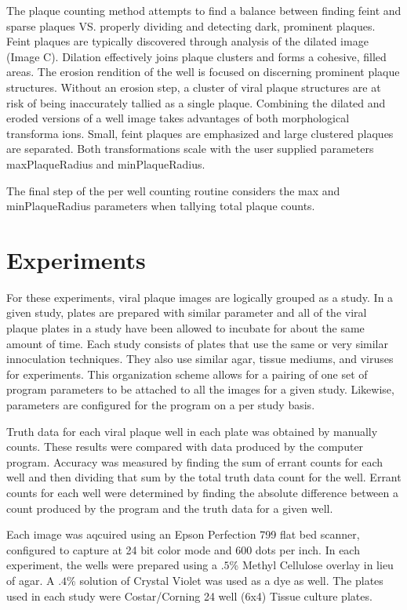 \documentclass[11pt,final,twocolumn]{IEEEtran}
\begin{document}
The plaque counting method attempts to find a balance between finding feint and sparse plaques VS. properly dividing and detecting dark, prominent plaques. Feint  plaques are typically discovered through analysis of the dilated image (Image C). Dilation effectively joins plaque clusters and forms a cohesive, filled areas. The erosion rendition of the well is focused on discerning prominent plaque structures.  Without an erosion step, a cluster of viral plaque structures are at risk of being inaccurately tallied as a single plaque. Combining the dilated and eroded versions of a well image takes advantages of both morphological transforma ions. Small, feint plaques are emphasized and large  clustered plaques are separated. Both transformations scale with the user supplied parameters maxPlaqueRadius and minPlaqueRadius.

The final step of the per well counting routine considers the max and minPlaqueRadius parameters when tallying total plaque counts. 

\section{Experiments}

For these experiments, viral plaque images are logically grouped as a study. In a given study, plates are prepared with similar parameter and all of the viral plaque plates in a study have been allowed to incubate for about the same amount of time. Each study consists of plates that use the same or very similar innoculation techniques. They also use similar agar, tissue mediums, and viruses for experiments. This organization scheme allows for a pairing of one set of program parameters to be attached to all the images for a given study. Likewise, parameters are configured for the program on a per study 
basis.

Truth data for each viral plaque well in each plate was obtained by manually counts. These results were compared with data produced by the computer program. Accuracy was measured by finding the sum of errant counts for each well and then dividing that sum by the total truth data count for the well. Errant counts for each well were determined by finding the absolute difference between a count produced by the program and the truth data for a given well.

Each image was aqcuired using an Epson Perfection 799 flat bed scanner, configured to capture at 24 bit color mode and 600 dots per inch. In each experiment, the wells were prepared using a $.5$\%   Methyl Cellulose overlay in lieu of agar. A $.4$\% solution of Crystal Violet was used as a dye as well. 
The plates used in each study were Costar/Corning 24 well (6x4) Tissue culture plates. 
\end{document}
